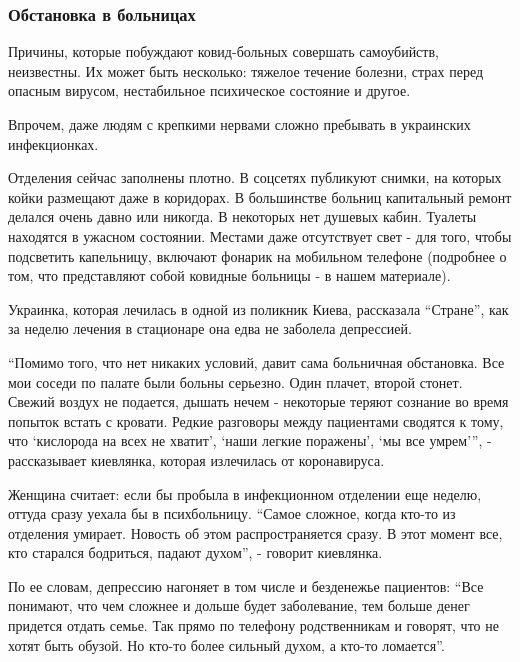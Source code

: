  
 
 
 
 

\subsubsection{Обстановка в больницах}

Причины, которые побуждают ковид-больных совершать самоубийств,
неизвестны. Их может быть несколько: тяжелое течение болезни, страх перед
опасным вирусом, нестабильное психическое состояние и другое. 

Впрочем, даже людям с крепкими нервами сложно пребывать в украинских
инфекционках. 

Отделения сейчас заполнены плотно. В соцсетях публикуют снимки, на которых
койки размещают даже в коридорах. В большинстве больниц капитальный ремонт
делался очень давно или никогда. В некоторых нет душевых кабин. Туалеты
находятся в ужасном состоянии. Местами даже отсутствует свет - для того,
чтобы подсветить капельницу, включают фонарик на мобильном телефоне
(подробнее о том, что представляют собой ковидные больницы - в нашем
материале). 

Украинка, которая лечилась в одной из поликник Киева, рассказала \enquote{Стране}, как
за неделю лечения в стационаре она едва не заболела депрессией.

\enquote{Помимо того, что нет никаких условий, давит сама больничная обстановка.
Все мои соседи по палате были больны серьезно. Один плачет, второй стонет.
Свежий воздух не подается, дышать нечем - некоторые теряют сознание во
время попыток встать с кровати. Редкие разговоры между пациентами сводятся
к тому, что \enquote{кислорода на всех не хватит}, \enquote{наши легкие поражены}, 
\enquote{мы все умрем}}, - рассказывает киевлянка, которая излечилась от коронавируса. 

Женщина считает: если бы пробыла в инфекционном отделении еще неделю,
оттуда сразу уехала бы в психбольницу. \enquote{Самое сложное, когда кто-то из
отделения умирает. Новость об этом распространяется сразу. В этот момент
все, кто старался бодриться, падают духом}, - говорит киевлянка. 

По ее словам, депрессию нагоняет в том числе и безденежье пациентов: \enquote{Все
понимают, что чем сложнее и дольше будет заболевание, тем больше денег
придется отдать семье. Так прямо по телефону родственникам и говорят, что
не хотят быть обузой. Но кто-то более сильный духом, а кто-то ломается}. 


